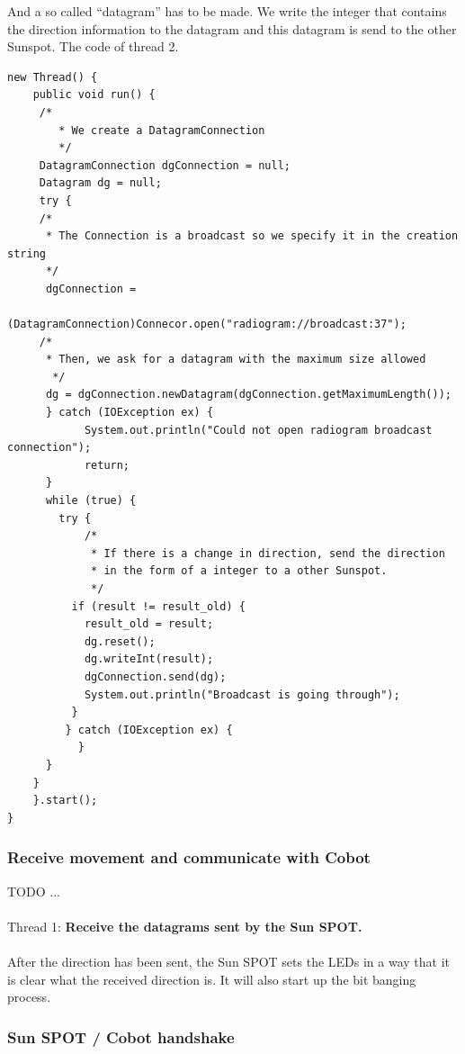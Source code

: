 \documentclass[a4paper,10pt]{article} %
\begin{document}
And a so called ``datagram'' has to be made. We write the integer that contains
the direction information to the datagram and this datagram is send to the other
Sunspot.
The code of thread 2.
\begin{verbatim}
new Thread() {
	public void run() {
  	 /*
   		* We create a DatagramConnection
   		*/
     DatagramConnection dgConnection = null;
     Datagram dg = null;
     try {
     /*
      * The Connection is a broadcast so we specify it in the creation string
      */
      dgConnection =
      	 	(DatagramConnection)Connecor.open("radiogram://broadcast:37");
     /*
      * Then, we ask for a datagram with the maximum size allowed
       */
      dg = dgConnection.newDatagram(dgConnection.getMaximumLength());
      } catch (IOException ex) {
        	System.out.println("Could not open radiogram broadcast connection");
        	return;
      }
      while (true) {
      	try {
        	/*
         	 * If there is a change in direction, send the direction
         	 * in the form of a integer to a other Sunspot.
         	 */
          if (result != result_old) {
          	result_old = result;
            dg.reset();
            dg.writeInt(result);
            dgConnection.send(dg);
            System.out.println("Broadcast is going through");
          }
         } catch (IOException ex) {
           }
      }
    }
	}.start();
}

\end{verbatim}


\subsubsection{Receive movement and communicate with Cobot} %
TODO ...
\\
\\
\noindent Thread 1: \textbf{Receive the datagrams sent by the Sun SPOT.}
\\
\\
After the direction has been sent, the Sun SPOT sets the LEDs in a way that
it is clear what the received direction is. It will also start up the bit
banging process.


\subsubsection{Sun SPOT / Cobot handshake} %
\label{ssub:Sun SPOT / Cobot handshake}
\end{document}

